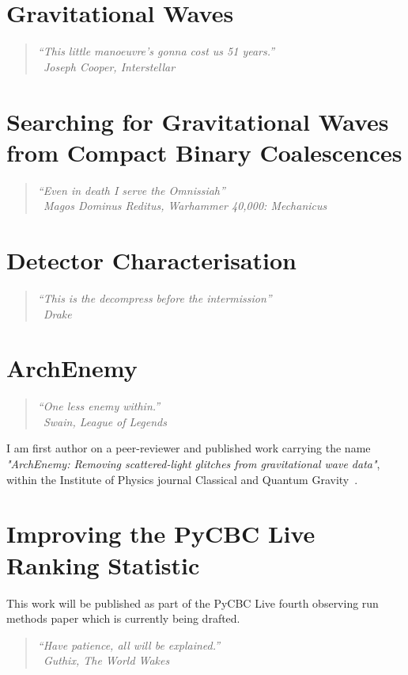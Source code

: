 \documentclass[12pt,twoside]{report} %
\makeatletter
\newcommand{\chapterquote}[2]{
  \begin{quote}
    \color{mediumgray}\itshape #1 \\[1ex] %
    \raggedleft %
    \textemdash\ #2
  \end{quote}
}
\renewcommand{\cleardoublepage}{%
  \clearpage%
  \if@twoside
    \ifodd\c@page
    \else
      \hbox{}%
      \thispagestyle{empty}%
      \newpage
    \fi
  \fi
}
\let\oldchapter\chapter
\renewcommand{\chapter}{\cleardoublepage\oldchapter}
\makeatother
\begin{document}
\chapter[Gravitational Waves]{\label{chapter:1-gravitational-waves}Gravitational Waves}
\chapterquote{``This little manoeuvre's gonna cost us 51 years.''}{Joseph Cooper, Interstellar}


\chapter[Searching for Gravitational-Waves from Compact Binary Coalescences]{\label{chapter:2-searches}Searching for Gravitational Waves from Compact Binary Coalescences}
\chapterquote{``Even in death I serve the Omnissiah''}{Magos Dominus Reditus, Warhammer 40,000: Mechanicus}


\chapter[Detector Characterisation]{\label{chapter:3-detchar}Detector Characterisation}
\chapterquote{``This is the decompress before the intermission''}{Drake}


\chapter[ArchEnemy]{\label{chapter:4-archenemy}ArchEnemy}
\chapterquote{``One less enemy within.''}{Swain, League of Legends}
I am first author on a peer-reviewer and published work carrying the name \textit{"ArchEnemy: Removing scattered-light glitches from gravitational wave data"}, within the Institute of Physics journal Classical and Quantum Gravity~\cite{ArchEnemy:2023}.


\chapter[Improving the PyCBC Live Ranking Statistic]{\label{chapter:5-pycbc-live}Improving the PyCBC Live Ranking Statistic}
This work will be published as part of the PyCBC Live fourth observing run methods paper which is currently being drafted.
\chapterquote{``Have patience, all will be explained.''}{Guthix, The World Wakes}

\end{document}
